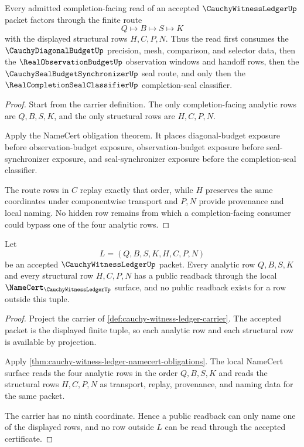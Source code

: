 \begin{theorem}
\label{thm:cauchy-witness-ledger-budget-factorization}
Every admitted completion-facing read of an accepted $\CauchyWitnessLedgerUp$ packet factors through the finite route
$$
Q \longmapsto B \longmapsto S \longmapsto K
$$
with the displayed structural rows $H,C,P,N$. Thus the read first consumes the $\CauchyDiagonalBudgetUp$ precision, mesh, comparison, and selector data, then the $\RealObservationBudgetUp$ observation windows and handoff rows, then the $\CauchySealBudgetSynchronizerUp$ seal route, and only then the $\RealCompletionSealClassifierUp$ completion-seal classifier.
\end{theorem}
\begin{proof}
Start from the carrier definition. The only completion-facing analytic rows are $Q,B,S,K$, and the only structural rows are $H,C,P,N$.

Apply the NameCert obligation theorem. It places diagonal-budget exposure before observation-budget exposure, observation-budget exposure before seal-synchronizer exposure, and seal-synchronizer exposure before the completion-seal classifier.

The route rows in $C$ replay exactly that order, while $H$ preserves the same coordinates under componentwise transport and $P,N$ provide provenance and local naming. No hidden row remains from which a completion-facing consumer could bypass one of the four analytic rows.
\end{proof}

\begin{theorem}
\label{thm:cauchy-witness-ledger-readback-totality}
Let
$$
L=(Q,B,S,K,H,C,P,N)
$$
be an accepted $\CauchyWitnessLedgerUp$ packet. Every analytic row $Q,B,S,K$ and every structural row $H,C,P,N$ has a public readback through the local $\NameCert_{\CauchyWitnessLedgerUp}$ surface, and no public readback exists for a row outside this tuple.
\end{theorem}
\begin{proof}
Project the carrier of \autoref{def:cauchy-witness-ledger-carrier}. The accepted packet is the displayed finite tuple, so each analytic row and each structural row is available by projection.

Apply \autoref{thm:cauchy-witness-ledger-namecert-obligations}. The local NameCert surface reads the four analytic rows in the order $Q,B,S,K$ and reads the structural rows $H,C,P,N$ as transport, replay, provenance, and naming data for the same packet.

The carrier has no ninth coordinate. Hence a public readback can only name one of the displayed rows, and no row outside $L$ can be read through the accepted certificate.
\end{proof}

